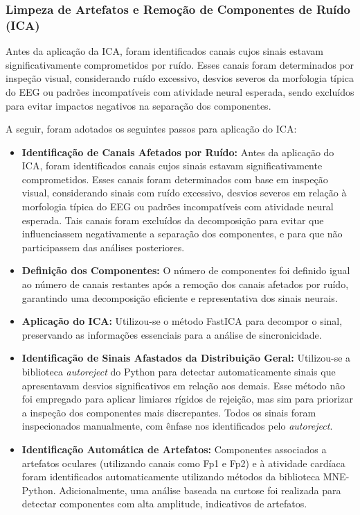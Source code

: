\subsubsection{Limpeza de Artefatos e Remoção de Componentes de Ruído (ICA)}
Antes da aplicação da ICA, foram identificados canais cujos sinais estavam significativamente comprometidos por ruído. Esses canais foram determinados por inspeção visual, considerando ruído excessivo, desvios severos da morfologia típica do EEG ou padrões incompatíveis com atividade neural esperada, sendo excluídos para evitar impactos negativos na separação dos componentes.

A seguir, foram adotados os seguintes passos para aplicação do ICA:
\begin{itemize}
    \item \textbf{Identificação de Canais Afetados por Ruído:} Antes da aplicação do ICA, foram identificados canais cujos sinais estavam significativamente comprometidos. Esses canais foram determinados com base em inspeção visual, considerando sinais com ruído excessivo, desvios severos em relação à morfologia típica do EEG ou padrões incompatíveis com atividade neural esperada. Tais canais foram excluídos da decomposição para evitar que influenciassem negativamente a separação dos componentes, e para que não participassem das análises posteriores.
    \item \textbf{Definição dos Componentes:} O número de componentes foi definido igual ao número de canais restantes após a remoção dos canais afetados por ruído, garantindo uma decomposição eficiente e representativa dos sinais neurais. 
    \item \textbf{Aplicação do ICA:} Utilizou-se o método FastICA para decompor o sinal, preservando as informações essenciais para a análise de sincronicidade. 
    \item \textbf{Identificação de Sinais Afastados da Distribuição Geral:} Utilizou-se a biblioteca \textit{autoreject} do Python para detectar automaticamente sinais que apresentavam desvios significativos em relação aos demais. Esse método não foi empregado para aplicar limiares rígidos de rejeição, mas sim para priorizar a inspeção dos componentes mais discrepantes. Todos os sinais foram inspecionados manualmente, com ênfase nos identificados pelo \textit{autoreject}.
    \item \textbf{Identificação Automática de Artefatos:} Componentes associados a artefatos oculares (utilizando canais como Fp1 e Fp2) e à atividade cardíaca foram identificados automaticamente utilizando métodos da biblioteca MNE-Python. Adicionalmente, uma análise baseada na curtose foi realizada para detectar componentes com alta amplitude, indicativos de artefatos. 

\end{itemize}

